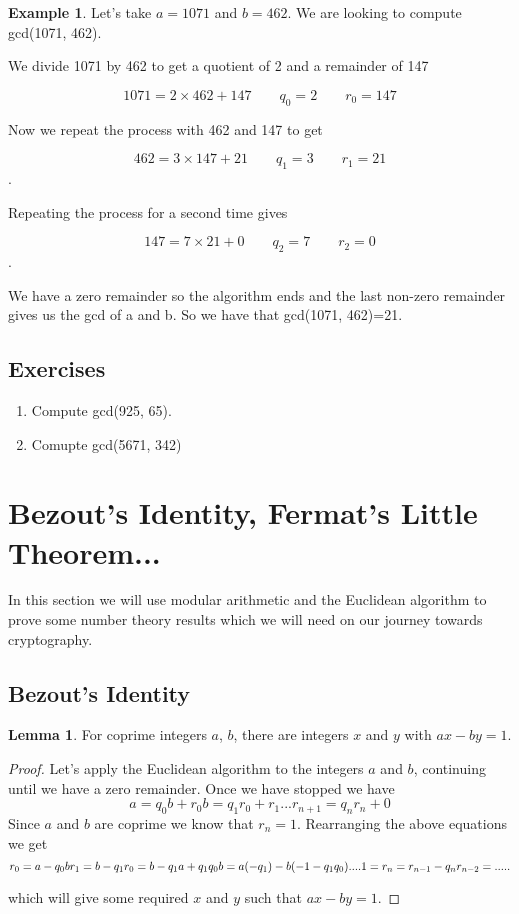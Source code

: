 \documentclass[12pt]{amsart}
\theoremstyle{definition}
\newtheorem{lemma}[theorem]{Lemma}
\theoremstyle{definition}
\newtheorem{example}{Example}
\theoremstyle{remark}
\begin{document}
\begin{example}
Let's take $a=1071$ and $b=462$. We are looking to compute gcd(1071, 462).

We divide 1071 by 462 to get a quotient of 2 and a remainder of 147

\[1071= 2\times 462 + 147 \qquad q_0 = 2 \qquad r_0=147\]

Now we repeat the process with 462 and 147 to get

\[462= 3\times 147 + 21 \qquad q_1 = 3 \qquad r_1=21\].

Repeating the process for a second time gives

\[147= 7\times 21 + 0 \qquad q_2 = 7 \qquad r_2=0\].

We have a zero remainder so the algorithm ends and the last non-zero remainder gives us the gcd of a and b. So we have that gcd(1071, 462)=21.
\end{example}

\subsection*{Exercises}
\begin{enumerate}
\item Compute gcd(925, 65).
\item Comupte gcd(5671, 342)
\end{enumerate}

\section{Bezout's Identity, Fermat's Little Theorem...}
In this section we will use modular arithmetic and the Euclidean algorithm to prove some number theory results which we will need on our journey towards cryptography.

\subsection*{Bezout's Identity}
\begin{lemma}
For coprime integers $a$, $b$, there are integers $x$ and $y$ with $ax-by=1$.
\end{lemma}
\begin{proof}
Let's apply the Euclidean algorithm to the integers $a$ and $b$, continuing until we have a zero remainder. Once we have stopped we have
\[
a = q_0 b +r_0
b = q_1 r_0 + r_1
...
r_{n+1} = q_n r_n +0
\]
Since $a$ and $b$ are coprime we know that $r_n=1$. Rearranging the above equations we get
\[
r_0 = a - q_0 b \\
r_1 = b - q_1r_0 = b - q_1a + q_1q_0b = a(-q_1) - b (-1-q_1q_0)\\
.... \\
1 = r_n = r_{n-1} - q_nr_{n-2} = .....
\]

which will give some required $x$ and $y$ such that $ax-by=1$.

\end{proof}
\end{document}
